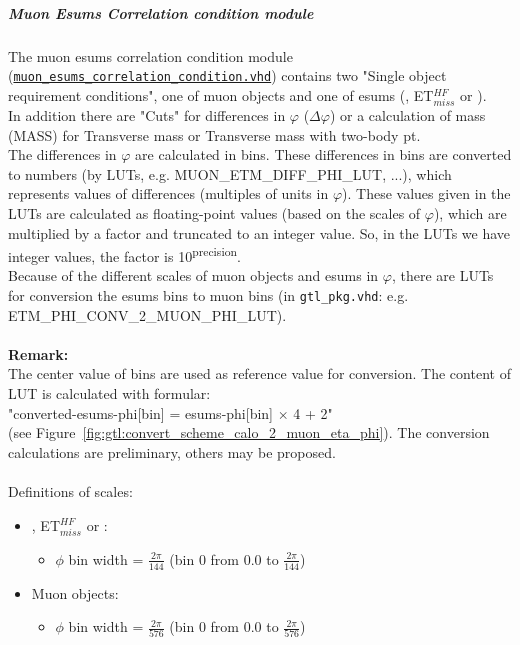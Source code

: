 \subparagraph{Muon Esums Correlation condition module}
\label{sec:gtl:muon_esums_correlation_condition_module}

The muon esums correlation condition module (\href{https://github.com/cms-l1-globaltrigger/mp7_ugt_legacy/tree/master/firmware/hdl/gt_mp7_core/gtl_fdl_wrapper/gtl/muon_esums_correlation_condition.vhd}{\texttt{muon\_esums\_correlation\_condition.vhd}}) contains two "Single object requirement conditions", one of muon objects and one of esums (\etm, ET$_{miss}^{HF}$ or \htm).\\
In addition there are "Cuts" for differences in $\varphi$ ($\Delta\varphi$) or a calculation of mass (MASS) for Transverse mass or Transverse mass with two-body pt.\\
The differences in $\varphi$ are calculated in bins. These differences in bins are converted to numbers (by LUTs, e.g. \small{MUON\_ETM\_DIFF\_PHI\_LUT}\normalsize, ...),
which represents values of differences (multiples of units in $\varphi$).
These values given in the LUTs are calculated as floating-point values (based on the scales of $\varphi$), which are multiplied by a factor and truncated to an integer value.
So, in the LUTs we have integer values, the factor is 10\textsuperscript{\tiny{precision}\normalsize}.\\
Because of the different scales of muon objects and esums in $\varphi$, there are LUTs for conversion the esums bins to muon bins (in \texttt{gtl\_pkg.vhd}:
 e.g. \small{ETM\_PHI\_CONV\_2\_MUON\_PHI\_LUT}\normalsize).\\\\
\textbf{Remark:}\\
The center value of bins are used as reference value for conversion.
The content of LUT is calculated with formular:\\
"converted-esums-phi[bin] = esums-phi[bin] $\times$ 4 + 2"\\ (see Figure~\ref{fig:gtl:convert_scheme_calo_2_muon_eta_phi}).
The conversion calculations are preliminary, others may be proposed.\\\\
Definitions of scales:
\begin{itemize}
\item \etm, ET$_{miss}^{HF}$ or \htm:
\begin{itemize}
\item $\phi$ bin width = $\frac{2\pi}{144}$ (bin 0 from 0.0 to $\frac{2\pi}{144}$)
\end{itemize}
\item Muon objects:
\begin{itemize}
\item $\phi$ bin width = $\frac{2\pi}{576}$ (bin 0 from 0.0 to $\frac{2\pi}{576}$)
\end{itemize}
\end{itemize}

